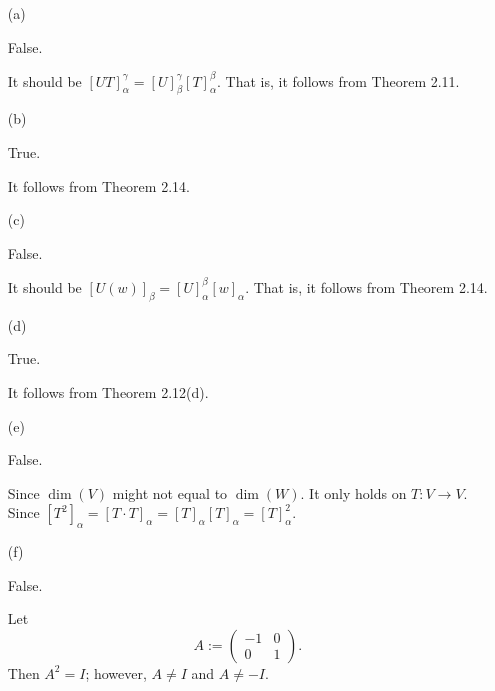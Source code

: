 \begin{Exercise}
	\begin{enumerate}[(a)]
		\item[(a)]
		\begin{answer}
			False.
		\end{answer}
		\begin{solution}
			It should be $[UT]_{\alpha}^{\gamma} = [U]_{\beta}^{\gamma}[T]_{\alpha}^{\beta}$. That is, it follows from Theorem 2.11.
		\end{solution}
		
		\item[(b)]
		\begin{answer}
			True.
		\end{answer}
		\begin{solution}
			It follows from Theorem 2.14.
		\end{solution}
		
		\item[(c)]
		\begin{answer}
			False.
		\end{answer}
		\begin{solution}
			It should be $[U(w)]_{\beta} = [U]_{\alpha}^{\beta}[w]_{\alpha}$. That is, it follows from Theorem 2.14.
		\end{solution}
		
		\item[(d)]
		\begin{answer}
			True.
		\end{answer}
		\begin{solution}
			It follows from Theorem 2.12(d).
		\end{solution}
		
		\item[(e)]
		\begin{answer}
			False.
		\end{answer}
		\begin{solution}
			Since $\dim(V)$ might not equal to $\dim(W)$.
			It only holds on $T:V\to V$. Since $[T^2]_{\alpha} = [T\cdot T]_{\alpha} = [T]_{\alpha}[T]_{\alpha} = [T]_{\alpha}^2$.
		\end{solution}
		
		\item[(f)]
		\begin{answer}
			False.
		\end{answer}
		\begin{solution}
			Let
			$$
			A := \begin{pmatrix}
			-1 & 0 \\
			0 & 1
			\end{pmatrix}.
			$$
			Then $A^2 = I$; however, $A\neq I$ and $A\neq -I$.
		\end{solution}
		

\end{enumerate}
\end{Exercise}
